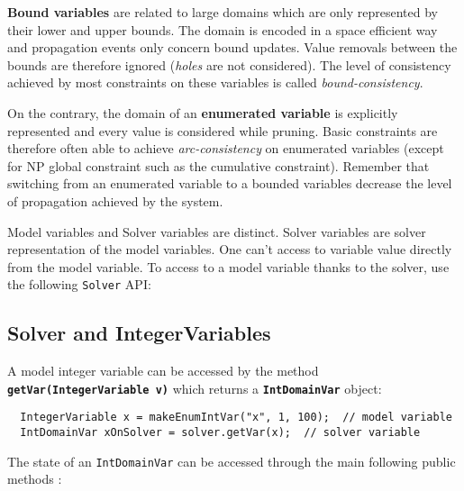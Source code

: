 \begin{note}
\textbf{Bound variables} are related to large domains which are only represented by their lower and upper bounds. The domain is encoded in a space efficient way and propagation events only concern bound updates. Value removals between the bounds are therefore ignored (\emph{holes} are not considered). The level of consistency achieved by most constraints on these variables is called \emph{bound-consistency}.

On the contrary, the domain of an \textbf{enumerated variable} is explicitly represented and every value is considered while pruning. Basic constraints are therefore often able to achieve \emph{arc-consistency} on enumerated variables (except for NP global constraint such as the cumulative constraint). Remember that switching from an enumerated variable to a bounded variables decrease the level of propagation achieved by the system.
\end{note}

Model variables and Solver variables are distinct. Solver variables are solver representation of the model variables. One can't access to variable value directly from the model variable. To access to a model variable thanks to the solver, use the following \texttt{Solver} API: 

\subsection{Solver and IntegerVariables}\label{solver:solverandintegervariables}\hypertarget{solver:solverandintegervariables}{}

A model integer variable can be accessed by the method \textbf{\tt getVar(IntegerVariable v)} which returns a \textbf{\tt IntDomainVar} object:
\begin{lstlisting}
  IntegerVariable x = makeEnumIntVar("x", 1, 100);  // model variable
  IntDomainVar xOnSolver = solver.getVar(x);  // solver variable
\end{lstlisting}

The state of an \texttt{IntDomainVar} can be accessed through the main following public methods :

